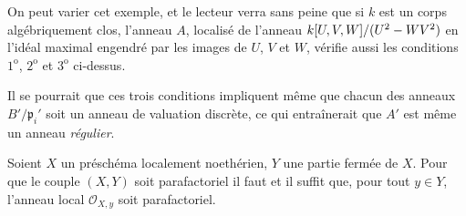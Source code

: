 \begin{examples}[21.13.9]
On peut varier cet exemple, et le lecteur verra sans peine que si $k$ est un corps
algébriquement clos, l'anneau $A$, localisé de l'anneau
$k[U,V,W]/(U^2- WV^2)$ en l'idéal maximal engendré par les images de $U$, $V$ et $W$,
vérifie aussi les conditions $1^{\mathrm o}$, $2^{\mathrm o}$ et $3^{\mathrm o}$
ci-dessus.

Il se pourrait que ces trois conditions impliquent même que chacun des anneaux
$B'/\mathfrak p_i'$ soit un anneau de valuation discrète, ce qui entraînerait que
$A'$ est même un anneau \emph{régulier}.
\end{examples}

\begin{proposition}[21.13.10]
\label{IV.21.13.10}
Soient $X$ un préschéma localement noethérien, $Y$ une partie fermée de $X$. Pour que
le couple $(X,Y)$ soit parafactoriel il faut et il suffit que, pour tout $y\in Y$,
l'anneau local $\mathcal O_{X,y}$ soit parafactoriel.
\end{proposition}

